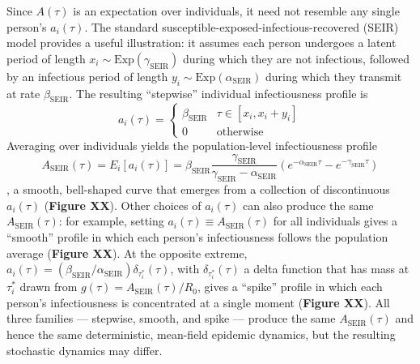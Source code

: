 Since $A(\tau)$ is an expectation over individuals, it need not resemble any single person's $a_i(\tau)$. The standard susceptible-exposed-infectious-recovered (SEIR) model provides a useful illustration: it assumes each person undergoes a latent period of length $x_i \sim \text{Exp}(\gamma_\text{SEIR})$ during which they are not infectious, followed by an infectious period of length $y_i \sim \text{Exp}(\alpha_\text{SEIR})$ during which they transmit at rate $\beta_\text{SEIR}$. The resulting ``stepwise'' individual infectiousness profile is 
%
\begin{equation}
	a_i(\tau) = \begin{cases}
		\beta_\text{SEIR} & \tau \in [x_i, x_i + y_i] \\ 
		0 & \text{otherwise}
	\end{cases}
	\label{eq:ai_SEIR}
\end{equation}
%
Averaging over individuals yields the population-level infectiousness profile 
\begin{equation}
	A_\text{SEIR}(\tau) = E_i[a_i(\tau)] = \beta_\text{SEIR} \frac{\gamma_\text{SEIR}}{\gamma_\text{SEIR} - \alpha_\text{SEIR}}(e^{-\alpha_\text{SEIR} \tau} - e^{-\gamma_\text{SEIR} \tau})
	\label{eq:A_SEIR}
\end{equation}
%
\ie, a smooth, bell-shaped curve that emerges from a collection of discontinuous $a_i(\tau)$ ({\bf Figure XX}). Other choices of $a_i(\tau)$ can also produce the same $A_\text{SEIR}(\tau)$: for example, setting $a_i(\tau) \equiv A_\text{SEIR}(\tau)$ for all individuals gives a ``smooth'' profile in which each person's infectiousness follows the population average ({\bf Figure XX}). At the opposite extreme, $a_i(\tau) = (\beta_\text{SEIR} / \alpha_\text{SEIR}) \delta_{\tau_i^*}(\tau)$, with $\delta_{\tau_i^*}(\tau)$ a delta function that has mass at $\tau_i^*$ drawn from $g(\tau) = A_\text{SEIR}(\tau) / R_0$, gives a ``spike'' profile in which each person's infectiousness is concentrated at a single moment ({\bf Figure XX}). All three families --- stepwise, smooth, and spike --- produce the same $A_\text{SEIR}(\tau)$ and hence the same deterministic, mean-field epidemic dynamics, but the resulting stochastic dynamics may differ. 

